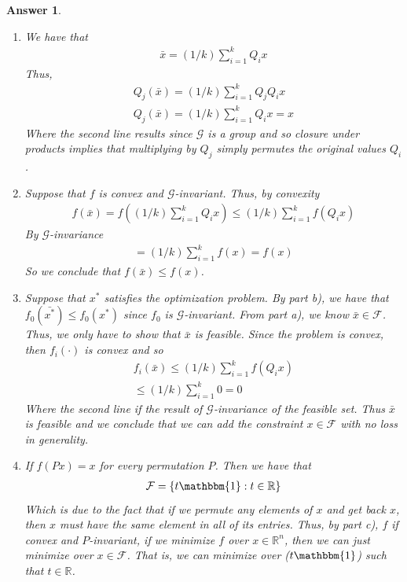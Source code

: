 \documentclass[12pt]{article}
\theoremstyle{colon}
\newtheorem*{answer}{Answer}
\begin{document}
\begin{answer}
  \leavevmode
  \begin{enumerate}[label=\alph*)]
    \item We have that
      \begin{gather*}
        \bar{x} = (1/k) \sum_{i=1}^k Q_i x
      \end{gather*}
      Thus,
      \begin{gather*}
        Q_j(\bar{x}) = (1/k) \sum_{i=1}^k Q_j Q_i x \\
        Q_j(\bar{x}) = (1/k) \sum_{i=1}^k Q_i x = x
      \end{gather*}
      Where the second line results since $\mathcal{G}$ is a group and so closure under products implies that multiplying by $Q_j$ simply permutes the original values $Q_i$.

    \item Suppose that $f$ is convex and $\mathcal{G}$-invariant. Thus, by convexity
      \begin{gather*}
        f(\bar{x}) = f((1/k) \sum_{i=1}^k Q_i x) \leq (1/k) \sum_{i=1}^k f(Q_i x)
      \end{gather*}
      By $\mathcal{G}$-invariance
      \begin{gather*}
        = (1/k) \sum_{i=1}^k f(x) = f(x)
      \end{gather*}
      So we conclude that $f(\bar{x}) \leq f(x)$.

    \item Suppose that $x^*$ satisfies the optimization problem. By part b), we have that $f_0(\bar{x^*}) \leq f_0(x^*)$ since $f_0$ is $\mathcal{G}$-invariant. From part a), we know $\bar{x} \in \mathcal{F}$. Thus, we only have to show that $\bar{x}$ is feasible. Since the problem is convex, then $f_i(\cdot)$ is convex and so
      \begin{gather*}
        f_i(\bar{x}) \leq (1/k) \sum_{i=1}^k f(Q_i x) \\
        \leq (1/k) \sum_{i=1}^k 0 = 0
      \end{gather*}
      Where the second line if the result of $\mathcal{G}$-invariance of the feasible set. Thus $\bar{x}$ is feasible and we conclude that we can add the constraint $x \in \mathcal{F}$ with no loss in generality.

    \item If $f(P x) = x$ for every permutation $P$. Then we have that
      \begin{gather*}
        \mathcal{F} = \{ t \mathbbm{1} : t\in \mathbb{R} \}
      \end{gather*}
      Which is due to the fact that if we permute any elements of $x$ and get back $x$, then $x$ must have the same element in all of its entries. Thus, by part c), $f$ if convex and $P$-invariant, if we minimize $f$ over $x \in \mathbb{R}^n$, then we can just minimize over $x \in \mathcal{F}$. That is, we can minimize over ($t \mathbbm{1}$) such that $t \in \mathbb{R}$.
  \end{enumerate}
\end{answer}
\end{document}
